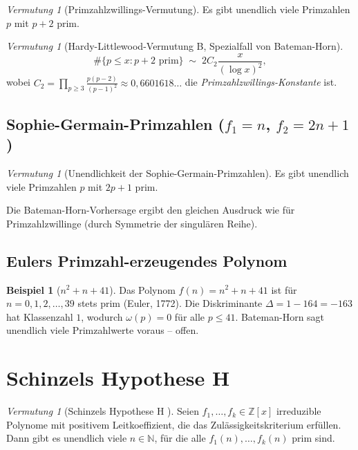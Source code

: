\documentclass[12pt,a4paper]{amsart}
\theoremstyle{definition}
\newtheorem{example}[theorem]{Beispiel}
\theoremstyle{remark}
\newtheorem{vermutung}[theorem]{Vermutung}
\newcommand{\Z}{\mathbb{Z}}
\newcommand{\N}{\mathbb{N}}
\begin{document}
\begin{vermutung}[Primzahlzwillings-Vermutung]\label{verm:zwillinge}
  Es gibt unendlich viele Primzahlen $p$ mit $p+2$ prim.
\end{vermutung}

\begin{vermutung}[Hardy-Littlewood-Vermutung B, Spezialfall von Bateman-Horn]
  \[
    \#\{p \leq x : p+2 \text{ prim}\} \;\sim\;
    2C_2 \frac{x}{(\log x)^2},
  \]
  wobei $C_2 = \prod_{p \geq 3} \frac{p(p-2)}{(p-1)^2} \approx 0{,}6601618\ldots$
  die \emph{Primzahlzwillings-Konstante} ist.
\end{vermutung}

\subsection{Sophie-Germain-Primzahlen ($f_1 = n$, $f_2 = 2n+1$)}

\begin{vermutung}[Unendlichkeit der Sophie-Germain-Primzahlen]\label{verm:sg}
  Es gibt unendlich viele Primzahlen $p$ mit $2p+1$ prim.
\end{vermutung}

Die Bateman-Horn-Vorhersage ergibt den gleichen Ausdruck wie für Primzahlzwillinge
(durch Symmetrie der singulären Reihe).

\subsection{Eulers Primzahl-erzeugendes Polynom}

\begin{example}[$n^2+n+41$]
  Das Polynom $f(n) = n^2+n+41$ ist für $n = 0, 1, 2, \ldots, 39$ stets prim
  (Euler, 1772). Die Diskriminante $\Delta = 1-164 = -163$ hat Klassenzahl $1$,
  wodurch $\omega(p) = 0$ für alle $p \leq 41$. Bateman-Horn sagt unendlich viele
  Primzahlwerte voraus -- offen.
\end{example}

\section{Schinzels Hypothese H}\label{sec:schinzel}

\begin{vermutung}[Schinzels Hypothese H \cite{Schinzel1958}]
  \label{verm:schinzel}
  Seien $f_1, \ldots, f_k \in \Z[x]$ irreduzible Polynome mit positivem Leitkoeffizient,
  die das Zulässigkeitskriterium erfüllen.
  Dann gibt es unendlich viele $n \in \N$, für die alle $f_1(n), \ldots, f_k(n)$ prim sind.
\end{vermutung}
\end{document}
